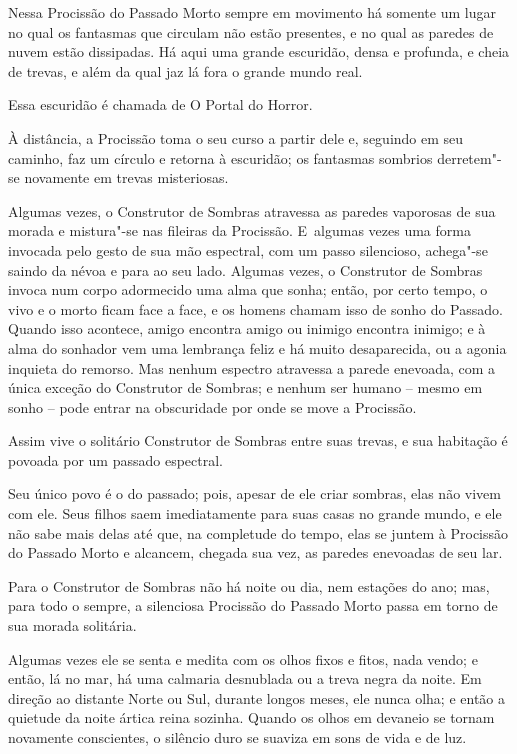 Nessa Procissão do Passado Morto sempre em movimento há somente um lugar
no qual os fantasmas que circulam não estão presentes, e no qual as
paredes de nuvem estão dissipadas. Há aqui uma grande escuridão, densa e
profunda, e cheia de trevas, e além da qual jaz lá fora o grande mundo
real.

Essa escuridão é chamada de O Portal do Horror.

À distância, a Procissão toma o seu curso a partir dele e, seguindo em
seu caminho, faz um círculo e retorna à escuridão; os fantasmas sombrios
derretem"-se novamente em trevas misteriosas.

Algumas vezes, o Construtor de Sombras atravessa as paredes vaporosas de
sua morada e mistura"-se nas fileiras da Procissão. E~algumas vezes uma
forma invocada pelo gesto de sua mão espectral, com um passo silencioso,
achega"-se saindo da névoa e para ao seu lado. Algumas vezes, o
Construtor de Sombras invoca num corpo adormecido uma alma que sonha;
então, por certo tempo, o vivo e o morto ficam face a face, e os homens
chamam isso de sonho do Passado. Quando isso acontece, amigo encontra
amigo ou inimigo encontra inimigo; e à alma do sonhador vem uma
lembrança feliz e há muito desaparecida, ou a agonia inquieta do
remorso. Mas nenhum espectro atravessa a parede enevoada, com a única
exceção do Construtor de Sombras; e nenhum ser humano -- mesmo em sonho
-- pode entrar na obscuridade por onde se move a Procissão.

Assim vive o solitário Construtor de Sombras entre suas trevas, e sua
habitação é povoada por um passado espectral.

Seu único povo é o do passado; pois, apesar de ele criar sombras, elas
não vivem com ele. Seus filhos saem imediatamente para suas casas no
grande mundo, e ele não sabe mais delas até que, na completude do tempo,
elas se juntem à Procissão do Passado Morto e alcancem, chegada sua vez,
as paredes enevoadas de seu lar.

Para o Construtor de Sombras não há noite ou dia, nem estações do ano;
mas, para todo o sempre, a silenciosa Procissão do Passado Morto passa
em torno de sua morada solitária.

Algumas vezes ele se senta e medita com os olhos fixos e fitos, nada
vendo; e então, lá no mar, há uma calmaria desnublada ou a treva negra
da noite. Em direção ao distante Norte ou Sul, durante longos meses, ele
nunca olha; e então a quietude da noite ártica reina sozinha. Quando os
olhos em devaneio se tornam novamente conscientes, o silêncio duro se
suaviza em sons de vida e de luz.

